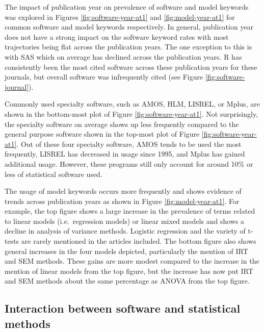 \documentclass[
  english,
  ,man]{apa6}
\begin{document}
The impact of publication year on prevalence of software and model keywords was explored in Figures \ref{fig:software-year-at1} and \ref{fig:model-year-at1} for common software and model keywords respectively. In general, publication year does not have a strong impact on the software keyword rates with most trajectories being flat across the publication years. The one exception to this is with SAS which on average has declined across the publication years. R has consistently been the most cited software across these publication years for these journals, but overall software was infrequently cited (see Figure \ref{fig:software-journal}).

Commonly used specialty software, such as AMOS, HLM, LISREL, or Mplus, are shown in the bottom-most plot of Figure \ref{fig:software-year-at1}. Not surprisingly, the specialty software on average shows up less frequently compared to the general purpose software shown in the top-most plot of Figure \ref{fig:software-year-at1}. Out of these four specialty software, AMOS tends to be used the most frequently, LISREL has decreased in usage since 1995, and Mplus has gained additional usage. However, these programs still only account for around 10\% or less of statistical software used.

The usage of model keywords occurs more frequently and shows evidence of trends across publication years as shown in Figure \ref{fig:model-year-at1}. For example, the top figure shows a large increase in the prevalence of terms related to linear models (i.e.~regression models) or linear mixed models and shows a decline in analysis of variance methods. Logistic regression and the variety of t-tests are rarely mentioned in the articles included. The bottom figure also shows general increases in the four models depicted, particularly the mention of IRT and SEM methods. These gains are more modest compared to the increase in the mention of linear models from the top figure, but the increase has now put IRT and SEM methods about the same percentage as ANOVA from the top figure.

\hypertarget{interaction-between-software-and-statistical-methods}{%
\subsection{Interaction between software and statistical methods}\label{interaction-between-software-and-statistical-methods}}
\end{document}
